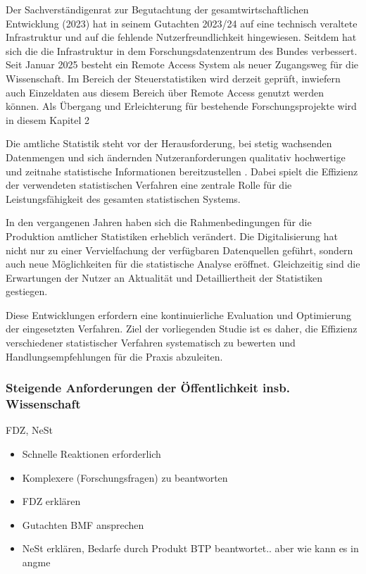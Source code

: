 \documentclass[
  german,
  10pt,
  twoside]{article}
\providecommand{\tightlist}{%
  \setlength{\itemsep}{0pt}\setlength{\parskip}{0pt}}
\begin{document}
Der Sachverständigenrat zur Begutachtung der gesamtwirtschaftlichen
Entwicklung (2023) hat in seinem Gutachten 2023/24 auf eine technisch
veraltete Infrastruktur und auf die fehlende Nutzerfreundlichkeit
hingewiesen. Seitdem hat sich die die Infrastruktur in dem
Forschungsdatenzentrum des Bundes verbessert. Seit Januar 2025 besteht
ein Remote Access System als neuer Zugangsweg für die Wissenschaft. Im
Bereich der Steuerstatistiken wird derzeit geprüft, inwiefern auch
Einzeldaten aus diesem Bereich über Remote Access genutzt werden können.
Als Übergang und Erleichterung für bestehende Forschungsprojekte wird in
diesem Kapitel 2

Die amtliche Statistik steht vor der Herausforderung, bei stetig
wachsenden Datenmengen und sich ändernden Nutzeranforderungen qualitativ
hochwertige und zeitnahe statistische Informationen bereitzustellen
\autocite{destatis2023}. Dabei spielt die Effizienz der verwendeten
statistischen Verfahren eine zentrale Rolle für die Leistungsfähigkeit
des gesamten statistischen Systems.

In den vergangenen Jahren haben sich die Rahmenbedingungen für die
Produktion amtlicher Statistiken erheblich verändert. Die
Digitalisierung hat nicht nur zu einer Vervielfachung der verfügbaren
Datenquellen geführt, sondern auch neue Möglichkeiten für die
statistische Analyse eröffnet. Gleichzeitig sind die Erwartungen der
Nutzer an Aktualität und Detailliertheit der Statistiken gestiegen.

Diese Entwicklungen erfordern eine kontinuierliche Evaluation und
Optimierung der eingesetzten Verfahren. Ziel der vorliegenden Studie ist
es daher, die Effizienz verschiedener statistischer Verfahren
systematisch zu bewerten und Handlungsempfehlungen für die Praxis
abzuleiten.

\subsubsection{Steigende Anforderungen der Öffentlichkeit insb.
Wissenschaft}\label{steigende-anforderungen-der-uxf6ffentlichkeit-insb.-wissenschaft}

FDZ, NeSt

\begin{itemize}
\tightlist
\item
  Schnelle Reaktionen erforderlich
\item
  Komplexere (Forschungsfragen) zu beantworten
\item
  FDZ erklären
\item
  Gutachten BMF ansprechen
\item
  NeSt erklären, Bedarfe durch Produkt BTP beantwortet.. aber wie kann
  es in angme
\end{itemize}
\end{document}
